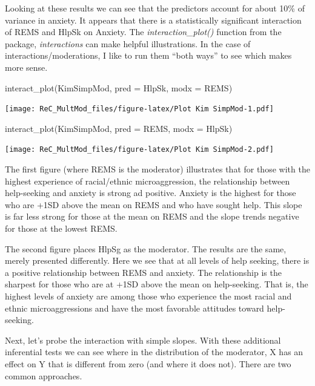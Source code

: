 \documentclass[
  11pt,
]{book}
\newenvironment{Shaded}{\begin{snugshade}}{\end{snugshade}}
\newcommand{\AttributeTok}[1]{\textcolor[rgb]{0.77,0.63,0.00}{#1}}
\newcommand{\FunctionTok}[1]{\textcolor[rgb]{0.00,0.00,0.00}{#1}}
\newcommand{\NormalTok}[1]{#1}
\begin{document}
Looking at these results we can see that the predictors account for about 10\% of variance in anxiety. It appears that there is a statistically significant interaction of REMS and HlpSk on Anxiety. The \emph{interaction\_plot()} function from the package, \emph{interactions} can make helpful illustrations. In the case of interactions/moderations, I like to run them ``both ways'' to see which makes more sense.

\begin{Shaded}
\begin{Highlighting}[]
\FunctionTok{interact\_plot}\NormalTok{(KimSimpMod, }\AttributeTok{pred =}\NormalTok{ HlpSk, }\AttributeTok{modx =}\NormalTok{ REMS)}
\end{Highlighting}
\end{Shaded}

\texttt{[image: ReC\_MultMod\_files/figure-latex/Plot Kim SimpMod-1.pdf]}

\begin{Shaded}
\begin{Highlighting}[]
\FunctionTok{interact\_plot}\NormalTok{(KimSimpMod, }\AttributeTok{pred =}\NormalTok{ REMS, }\AttributeTok{modx =}\NormalTok{ HlpSk)}
\end{Highlighting}
\end{Shaded}

\texttt{[image: ReC\_MultMod\_files/figure-latex/Plot Kim SimpMod-2.pdf]}

The first figure (where REMS is the moderator) illustrates that for those with the highest experience of racial/ethnic microaggression, the relationship between help-seeking and anxiety is strong ad positive. Anxiety is the highest for those who are +1SD above the mean on REMS and who have sought help. This slope is far less strong for those at the mean on REMS and the slope trends negative for those at the lowest REMS.

The second figure places HlpSg as the moderator. The results are the same, merely presented differently. Here we see that at all levels of help seeking, there is a positive relationship between REMS and anxiety. The relationship is the sharpest for those who are at +1SD above the mean on help-seeking. That is, the highest levels of anxiety are among those who experience the most racial and ethnic microaggressions and have the most favorable attitudes toward help-seeking.

Next, let's probe the interaction with simple slopes. With these additional inferential tests we can see where in the distribution of the moderator, X has an effect on Y that is different from zero (and where it does not). There are two common approaches.
\end{document}
